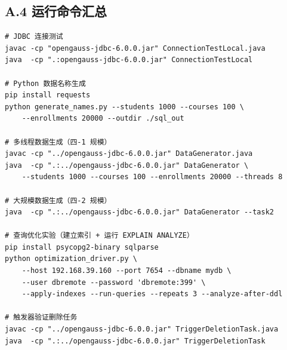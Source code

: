 \documentclass[12pt,a4paper]{ctexart}
\begin{document}
\subsection*{A.4 运行命令汇总}

\begin{verbatim}
# JDBC 连接测试
javac -cp "opengauss-jdbc-6.0.0.jar" ConnectionTestLocal.java
java  -cp ".:opengauss-jdbc-6.0.0.jar" ConnectionTestLocal

# Python 数据名称生成
pip install requests
python generate_names.py --students 1000 --courses 100 \
    --enrollments 20000 --outdir ./sql_out

# 多线程数据生成（四-1 规模）
javac -cp "../opengauss-jdbc-6.0.0.jar" DataGenerator.java
java  -cp ".:../opengauss-jdbc-6.0.0.jar" DataGenerator \
    --students 1000 --courses 100 --enrollments 20000 --threads 8

# 大规模数据生成（四-2 规模）
java  -cp ".:../opengauss-jdbc-6.0.0.jar" DataGenerator --task2

# 查询优化实验（建立索引 + 运行 EXPLAIN ANALYZE）
pip install psycopg2-binary sqlparse
python optimization_driver.py \
    --host 192.168.39.160 --port 7654 --dbname mydb \
    --user dbremote --password 'dbremote:399' \
    --apply-indexes --run-queries --repeats 3 --analyze-after-ddl

# 触发器验证删除任务
javac -cp "../opengauss-jdbc-6.0.0.jar" TriggerDeletionTask.java
java  -cp ".:../opengauss-jdbc-6.0.0.jar" TriggerDeletionTask
\end{verbatim}
\end{document}
